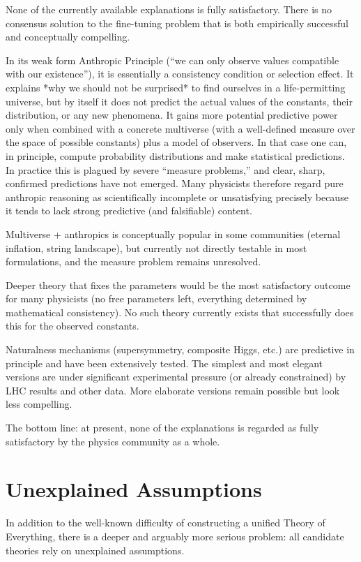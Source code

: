 None of the currently available explanations is fully satisfactory. There is no consensus solution to the fine-tuning problem that is both empirically successful and conceptually compelling.

In its weak form Anthropic Principle (“we can only observe values compatible with our existence”), it is essentially a consistency condition or selection effect.
It explains *why we should not be surprised* to find ourselves in a life-permitting universe, but by itself it does not predict the actual values of the constants, their distribution, or any new phenomena.
It gains more potential predictive power only when combined with a concrete multiverse (with a well-defined measure over the space of possible constants) plus a model of observers. In that case one can, in principle, compute probability distributions and make statistical predictions. In practice this is plagued by severe “measure problems,” and clear, sharp, confirmed predictions have not emerged.
Many physicists therefore regard pure anthropic reasoning as scientifically incomplete or unsatisfying precisely because it tends to lack strong predictive (and falsifiable) content.

Multiverse + anthropics is conceptually popular in some communities (eternal inflation, string landscape), but currently not directly testable in most formulations, and the measure problem remains unresolved.

Deeper theory that fixes the parameters would be the most satisfactory outcome for many physicists (no free parameters left, everything determined by mathematical consistency).
No such theory currently exists that successfully does this for the observed constants.

Naturalness mechanisms (supersymmetry, composite Higgs, etc.) are predictive in principle and have been extensively tested.
The simplest and most elegant versions are under significant experimental pressure (or already constrained) by LHC results and other data.
More elaborate versions remain possible but look less compelling.

The bottom line: at present, none of the explanations is regarded as fully satisfactory by the physics community as a whole. 



\section{Unexplained Assumptions}

In addition to the well-known difficulty of constructing a unified Theory of Everything, there is a deeper and arguably more serious problem: all candidate theories rely on unexplained assumptions.

